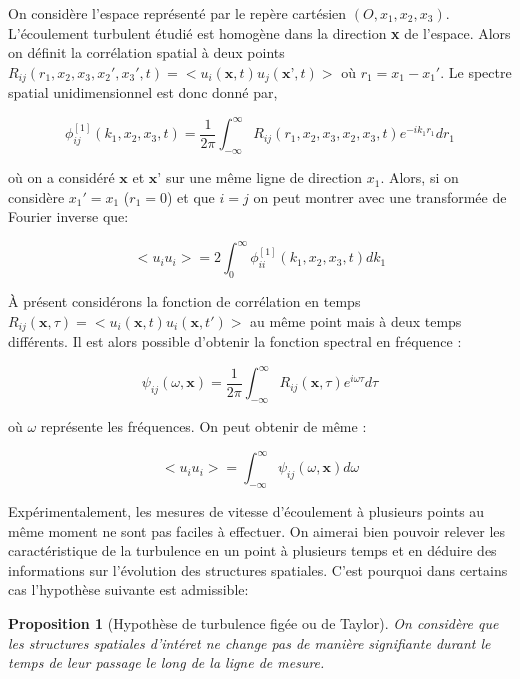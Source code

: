 \documentclass[12pt]{article}   %
\theoremstyle{plain}
\newtheorem{proposition}[theorem]{Proposition}
\theoremstyle{remark}
\begin{document}
		On considère l'espace représenté par le repère cartésien $(O,x_1,x_2,x_3)$. L'écoulement turbulent étudié est homogène dans la direction \textbf{x} de l'espace. Alors on définit la corrélation spatial à deux points \\$R_{ij}(r_1, x_2,x_3,x_2',x_3',t) = <u_i(\textbf{x},t)u_j(\textbf{x'},t)>$ où $r_1=x_1-x_1'$. Le spectre spatial unidimensionnel est donc donné par,
		
		\begin{equation}
			\phi_{ij}^{[1]}(k_1,x_2,x_3,t)=\frac{1}{2\pi}\int_{-\infty}^{\infty}R_{ij}(r_1,x_2,x_3,x_2,x_3,t)e^{-ik_1r_1}dr_1
		\end{equation}
	
		où on a considéré $\textbf{x}$ et $\textbf{x'}$ sur une même ligne de direction $x_1$. Alors, si on considère $x_1'=x_1$ ($r_1=0$) et que $i=j$ on peut montrer avec une transformée de Fourier inverse que:
		
		\begin{equation}
			<u_iu_i>=2\int_{0}^{\infty}\phi_{ii}^{[1]}(k_1,x_2,x_3,t)dk_1
		\end{equation}
	
		À présent considérons la fonction de corrélation en temps $R_{ij}(\textbf{x},\tau)=<u_i(\textbf{x},t)u_i(\textbf{x},t')>$ au même point mais à deux temps différents. Il est alors possible d'obtenir la fonction spectral en fréquence :
		
		\begin{equation}
			\psi_{ij}(\omega,\textbf{x})=\frac{1}{2\pi}\int_{-\infty}^{\infty}R_{ij}(\textbf{x},\tau)e^{i\omega\tau}d\tau
		\end{equation}
	
		où $\omega$ représente les fréquences. On peut obtenir de même : 
		
		\begin{equation}
			<u_iu_i>=\int_{-\infty}^{\infty}\psi_{ij}(\omega,\textbf{x})d\omega
		\end{equation}
		
		
		Expérimentalement, les mesures de vitesse d'écoulement à plusieurs points au même moment ne sont pas faciles à effectuer. On aimerai bien pouvoir relever les caractéristique de la turbulence en un point à plusieurs temps et en déduire des informations sur l'évolution des structures spatiales. C'est pourquoi dans certains cas l'hypothèse suivante est admissible:
		
		\begin{proposition}[Hypothèse de turbulence figée ou de Taylor]
			On considère que les structures spatiales d'intéret ne change pas de manière signifiante durant le temps de leur passage le long de la ligne de mesure. 
			\label{prop:turb-fig}
		\end{proposition}
	
\end{document}
